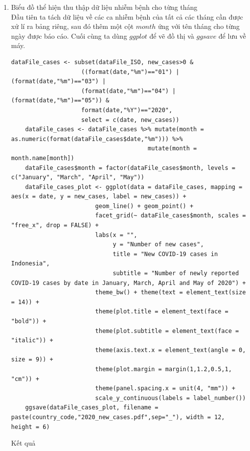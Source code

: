 \documentclass[a4paper]{article}
\theoremstyle{definition}
\begin{document}
\begin{enumerate}[1)]
    \item Biểu đồ thể hiện thu thập dữ liệu nhiễm bệnh cho từng tháng\\
    Đầu tiên ta tách dữ liệu về các ca nhiễm bệnh của tất cả các tháng cần được xử lí ra bảng riêng, sau đó thêm một cột $month$ ứng với tên tháng cho từng ngày được báo cáo. Cuối cùng ta dùng $ggplot$ để vẽ đồ thị và $ggsave$ để lưu về máy.
    \begin{lstlisting}[gobble=4]
    dataFile_cases <- subset(dataFile_ISO, new_cases>0 &
                    ((format(date,"%m")=="01") | (format(date,"%m")=="03") |
                    (format(date,"%m")=="04") | (format(date,"%m")=="05")) & 
                    format(date,"%Y")=="2020",
                    select = c(date, new_cases))
    dataFile_cases <- dataFile_cases %>% mutate(month = as.numeric(format(dataFile_cases$date,"%m"))) %>%
                                       mutate(month = month.name[month])
    dataFile_cases$month = factor(dataFile_cases$month, levels = c("January", "March", "April", "May"))
    dataFile_cases_plot <- ggplot(data = dataFile_cases, mapping = aes(x = date, y = new_cases, label = new_cases)) +
                        geom_line() + geom_point() + 
                        facet_grid(~ dataFile_cases$month, scales = "free_x", drop = FALSE) +
                        labs(x = "",
                             y = "Number of new cases",
                             title = "New COVID-19 cases in Indonesia",
                             subtitle = "Number of newly reported COVID-19 cases by date in January, March, April and May of 2020") +
                        theme_bw() + theme(text = element_text(size = 14)) +
                        theme(plot.title = element_text(face = "bold")) +
                        theme(plot.subtitle = element_text(face = "italic")) +
                        theme(axis.text.x = element_text(angle = 0, size = 9)) +
                        theme(plot.margin = margin(1,1.2,0.5,1, "cm")) +
                        theme(panel.spacing.x = unit(4, "mm")) +
                        scale_y_continuous(labels = label_number())
    ggsave(dataFile_cases_plot, filename = paste(country_code,"2020_new_cases.pdf",sep="_"), width = 12, height = 6)
    \end{lstlisting}
    
    Kết quả
    

\end{enumerate}
\end{document}
